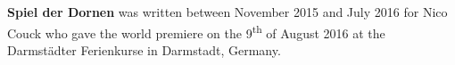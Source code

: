 \textbf{Spiel der Dornen} was written between November 2015 and July 2016 for
Nico Couck who gave the world premiere on the 9\textsuperscript{th} of August
2016 at the Darmst\"{a}dter Ferienkurse in Darmstadt, Germany.
